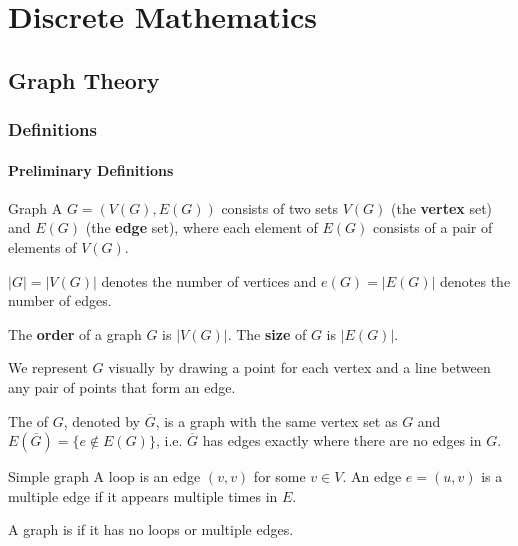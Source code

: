 \part{Discrete Mathematics}
\chapter{Graph Theory}

\section{Definitions}
\subsection{Preliminary Definitions}
\begin{defn}{Graph}{}
A  $G = (V(G),E(G))$ consists of two sets $V(G)$ (the \textbf{vertex} set) and $E(G)$ (the \textbf{edge} set), where each element of $E(G)$ consists of a pair of elements of $V(G)$. 
\end{defn}

\begin{notation}
$|G|=|V(G)|$ denotes the number of vertices and $e(G) =|E(G)|$ denotes the number of edges.
\end{notation}

The \textbf{order} of a graph $G$ is $|V(G)|$. The \textbf{size} of $G$ is $|E(G)|$.

We represent $G$ visually by drawing a point for each vertex and a line between any pair of points that form an edge.

The  of $G$, denoted by $\overline{G}$, is a graph with the same vertex set as $G$ and $E(\overline{G}) = \{e \notin E(G)\}$, i.e. $\overline{G}$ has edges exactly where there are no edges in $G$.

\begin{defn}{Simple graph}{}
A loop is an edge $(v,v)$ for some $v \in V$. An edge $e = (u,v)$ is a multiple edge if it appears multiple times in $E$. 

A graph is  if it has no loops or multiple edges.
\end{defn}

